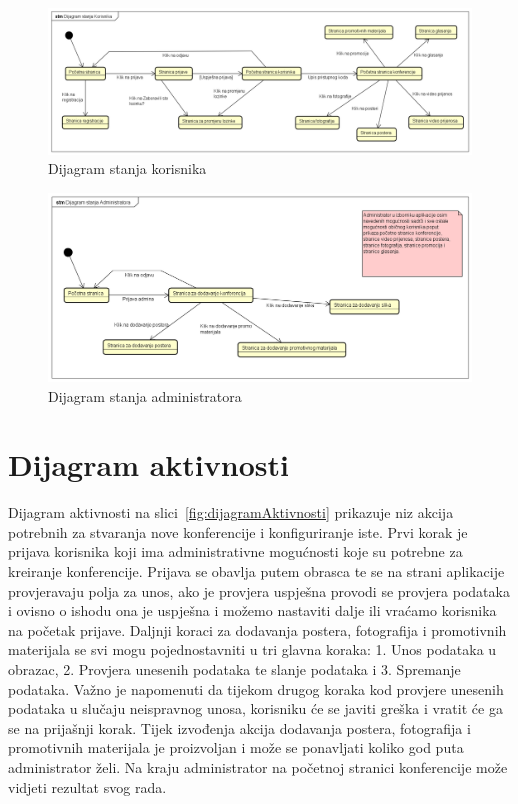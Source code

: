 			\begin{figure}[H]
				\includegraphics[width=\textwidth]{slike/korisnikStanja.PNG} %
				\caption{Dijagram stanja korisnika}
				\label{fig:korisnikStanje} %
			\end{figure}
			
			\begin{figure}[H]
				\includegraphics[width=\textwidth]{slike/adminStanja.PNG} %
				\caption{Dijagram stanja administratora}
				\label{fig:adminStanje} %
			\end{figure}
		


			\eject

		\section{Dijagram aktivnosti}

			Dijagram aktivnosti na slici~\ref{fig:dijagramAktivnosti} prikazuje niz akcija potrebnih za stvaranja nove konferencije i konfiguriranje iste. Prvi korak je prijava korisnika koji ima administrativne mogućnosti koje su potrebne za kreiranje konferencije. Prijava se obavlja putem obrasca te se na strani aplikacije provjeravaju polja za unos, ako je provjera uspješna provodi se provjera podataka i ovisno o ishodu ona je uspješna i možemo nastaviti dalje ili vraćamo korisnika na početak prijave. Daljnji koraci za dodavanja postera, fotografija i promotivnih materijala se svi mogu pojednostavniti u tri glavna koraka: 1. Unos podataka u obrazac, 2. Provjera unesenih podataka te slanje podataka i 3. Spremanje podataka. Važno je napomenuti da tijekom drugog koraka kod provjere unesenih podataka u slučaju neispravnog unosa, korisniku će se javiti greška i vratit će ga se na prijašnji korak. Tijek izvođenja akcija dodavanja postera, fotografija i promotivnih materijala je proizvoljan i može se ponavljati koliko god puta administrator želi. Na kraju administrator na početnoj stranici konferencije može vidjeti rezultat svog rada.
			
